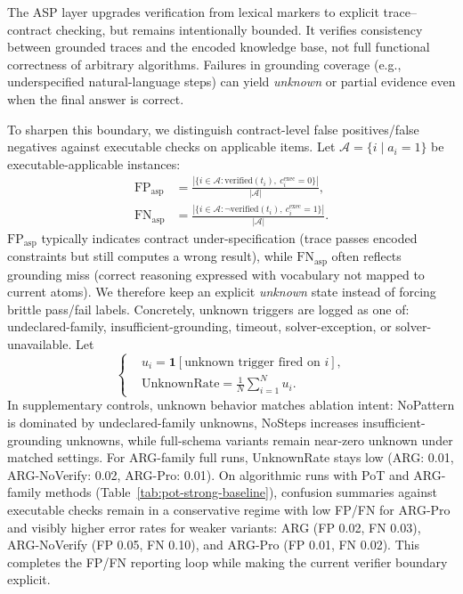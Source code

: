 \documentclass{article}
\begin{document}
The ASP layer upgrades verification from lexical markers to explicit trace--contract checking, but remains intentionally bounded. It verifies consistency between grounded traces and the encoded knowledge base, not full functional correctness of arbitrary algorithms. Failures in grounding coverage (e.g., underspecified natural-language steps) can yield \emph{unknown} or partial evidence even when the final answer is correct.

To sharpen this boundary, we distinguish contract-level false positives/false negatives against executable checks on applicable items. Let \(\mathcal{A}=\{i\mid a_i=1\}\) be executable-applicable instances:
\begin{equation}
\label{eq:asp-fpfn}
\begin{aligned}
\mathrm{FP}_{\mathrm{asp}}&=\frac{|\{i\in\mathcal{A}:\mathrm{verified}(t_i),\ c_i^{\text{exec}}=0\}|}{|\mathcal{A}|},\\
\mathrm{FN}_{\mathrm{asp}}&=\frac{|\{i\in\mathcal{A}:\neg\mathrm{verified}(t_i),\ c_i^{\text{exec}}=1\}|}{|\mathcal{A}|}.
\end{aligned}
\end{equation}
\(\mathrm{FP}_{\mathrm{asp}}\) typically indicates contract under-specification (trace passes encoded constraints but still computes a wrong result), while \(\mathrm{FN}_{\mathrm{asp}}\) often reflects grounding miss (correct reasoning expressed with vocabulary not mapped to current atoms). We therefore keep an explicit \emph{unknown} state instead of forcing brittle pass/fail labels.
Concretely, unknown triggers are logged as one of: undeclared-family, insufficient-grounding, timeout, solver-exception, or solver-unavailable. Let
\begin{equation}
\label{eq:unknown-rate}
\left\{
\begin{aligned}
&u_i = \mathbf{1}[\text{unknown trigger fired on }i],\\
&\mathrm{UnknownRate} = \frac{1}{N}\sum_{i=1}^{N}u_i.
\end{aligned}
\right.
\end{equation}
In supplementary controls, unknown behavior matches ablation intent: NoPattern is dominated by undeclared-family unknowns, NoSteps increases insufficient-grounding unknowns, while full-schema variants remain near-zero unknown under matched settings. For ARG-family full runs, UnknownRate stays low (ARG: 0.01, ARG-NoVerify: 0.02, ARG-Pro: 0.01).
On algorithmic runs with PoT and ARG-family methods (Table~\ref{tab:pot-strong-baseline}), confusion summaries against executable checks remain in a conservative regime with low FP/FN for ARG-Pro and visibly higher error rates for weaker variants: ARG (FP 0.02, FN 0.03), ARG-NoVerify (FP 0.05, FN 0.10), and ARG-Pro (FP 0.01, FN 0.02). This completes the FP/FN reporting loop while making the current verifier boundary explicit.
\end{document}
